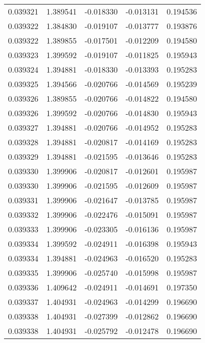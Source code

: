 \begin{tabular}{lrrrr}
0.039321    &  1.389541 & -0.018330 & -0.013131 &             0.194536 \\
0.039322    &  1.384830 & -0.019107 & -0.013777 &             0.193876 \\
0.039322    &  1.389855 & -0.017501 & -0.012209 &             0.194580 \\
0.039323    &  1.399592 & -0.019107 & -0.011825 &             0.195943 \\
0.039324    &  1.394881 & -0.018330 & -0.013393 &             0.195283 \\
0.039325    &  1.394566 & -0.020766 & -0.014569 &             0.195239 \\
0.039326    &  1.389855 & -0.020766 & -0.014822 &             0.194580 \\
0.039326    &  1.399592 & -0.020766 & -0.014830 &             0.195943 \\
0.039327    &  1.394881 & -0.020766 & -0.014952 &             0.195283 \\
0.039328    &  1.394881 & -0.020817 & -0.014169 &             0.195283 \\
0.039329    &  1.394881 & -0.021595 & -0.013646 &             0.195283 \\
0.039330    &  1.399906 & -0.020817 & -0.012601 &             0.195987 \\
0.039330    &  1.399906 & -0.021595 & -0.012609 &             0.195987 \\
0.039331    &  1.399906 & -0.021647 & -0.013785 &             0.195987 \\
0.039332    &  1.399906 & -0.022476 & -0.015091 &             0.195987 \\
0.039333    &  1.399906 & -0.023305 & -0.016136 &             0.195987 \\
0.039334    &  1.399592 & -0.024911 & -0.016398 &             0.195943 \\
0.039334    &  1.394881 & -0.024963 & -0.016520 &             0.195283 \\
0.039335    &  1.399906 & -0.025740 & -0.015998 &             0.195987 \\
0.039336    &  1.409642 & -0.024911 & -0.014691 &             0.197350 \\
0.039337    &  1.404931 & -0.024963 & -0.014299 &             0.196690 \\
0.039338    &  1.404931 & -0.027399 & -0.012862 &             0.196690 \\
0.039338    &  1.404931 & -0.025792 & -0.012478 &             0.196690 \\

\end{tabular}
